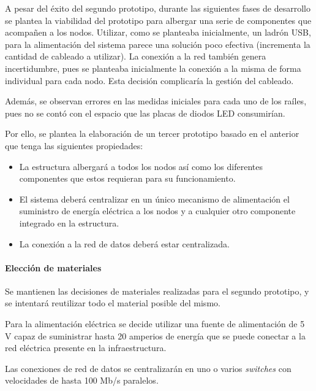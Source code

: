 A pesar del éxito del segundo prototipo, durante las siguientes fases de desarrollo se plantea la viabilidad del prototipo para albergar una serie de componentes que acompañen a los nodos. Utilizar, como se planteaba inicialmente, un ladrón USB, para la alimentación del sistema parece una solución poco efectiva (incrementa la cantidad de cableado a utilizar). La conexión a la red también genera incertidumbre, pues se planteaba inicialmente la conexión a la misma de forma individual para cada nodo. Esta decisión complicaría la gestión del cableado.

Además, se observan errores en las medidas iniciales para cada uno de los raíles, pues no se contó con el espacio que las placas de diodos LED consumirían.

Por ello, se plantea la elaboración de un tercer prototipo basado en el anterior que tenga las siguientes propiedades:

\begin{itemize}

\item La estructura albergará a todos los nodos así como los diferentes componentes que estos requieran para su funcionamiento.

\item El sistema deberá centralizar en un único mecanismo de alimentación el suministro de energía eléctrica a los nodos y a cualquier otro componente integrado en la estructura.

\item La conexión a la red de datos deberá estar centralizada.

\end{itemize}

\paragraph{Elección de materiales\\}

Se mantienen las decisiones de materiales realizadas para el segundo prototipo, y se intentará reutilizar todo el material posible del mismo.

Para la alimentación eléctrica se decide utilizar una fuente de alimentación de 5 V capaz de suministrar hasta 20 amperios de energía que se puede conectar a la red eléctrica presente en la infraestructura.

Las conexiones de red de datos se centralizarán en uno o varios \textit{switches} con velocidades de hasta 100 Mb/s paralelos.

